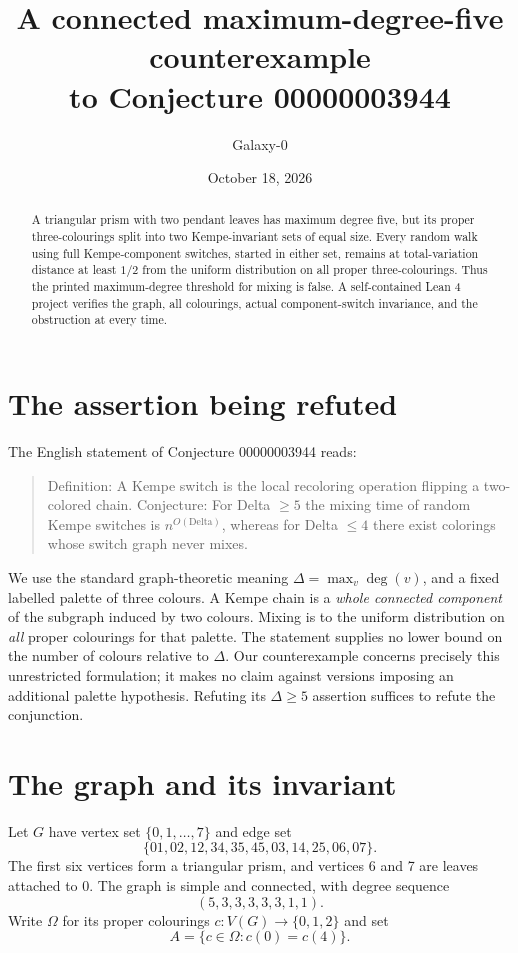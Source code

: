 \documentclass[11pt]{article}
\title{A connected maximum-degree-five counterexample\\to Conjecture 00000003944}
\author{Galaxy-0}
\date{October 18, 2026}
\begin{document}
\maketitle
\begin{abstract}
A triangular prism with two pendant leaves has maximum degree five, but its proper three-colourings split into two Kempe-invariant sets of equal size. Every random walk using full Kempe-component switches, started in either set, remains at total-variation distance at least $1/2$ from the uniform distribution on all proper three-colourings. Thus the printed maximum-degree threshold for mixing is false. A self-contained Lean 4 project verifies the graph, all colourings, actual component-switch invariance, and the obstruction at every time.
\end{abstract}

\section{The assertion being refuted}
The English statement of Conjecture 00000003944 reads:
\begin{quote}
Definition: A Kempe switch is the local recoloring operation flipping a two-colored chain. Conjecture: For Delta $\geq 5$ the mixing time of random Kempe switches is $n^{O(\mathrm{Delta})}$, whereas for Delta $\leq 4$ there exist colorings whose switch graph never mixes.
\end{quote}
We use the standard graph-theoretic meaning $\Delta=\max_v\deg(v)$, and a fixed labelled palette of three colours. A Kempe chain is a \emph{whole connected component} of the subgraph induced by two colours. Mixing is to the uniform distribution on \emph{all} proper colourings for that palette. The statement supplies no lower bound on the number of colours relative to $\Delta$. Our counterexample concerns precisely this unrestricted formulation; it makes no claim against versions imposing an additional palette hypothesis. Refuting its $\Delta\geq5$ assertion suffices to refute the conjunction.

\section{The graph and its invariant}
Let $G$ have vertex set $\{0,1,\ldots,7\}$ and edge set
\[
\{01,02,12,34,35,45,03,14,25,06,07\}.
\]
The first six vertices form a triangular prism, and vertices 6 and 7 are leaves attached to 0. The graph is simple and connected, with degree sequence
\[
(5,3,3,3,3,3,1,1).
\]
Write $\Omega$ for its proper colourings $c:V(G)\to\{0,1,2\}$ and set
\[
A=\{c\in\Omega:c(0)=c(4)\}.
\]
\end{document}
